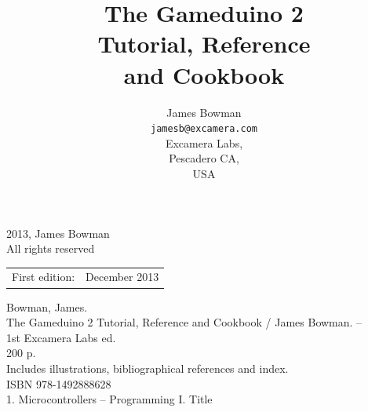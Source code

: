 \documentclass[10pt]{book}
\title{\LARGE \bf
The Gameduino 2 \\
Tutorial, Reference \\
and Cookbook
}
\author{James Bowman \\
	{\tt\small jamesb@excamera.com} \\
  Excamera Labs, \\
  Pescadero CA, \\
  USA
}
\date{}
\begin{document}
\maketitle

\begingroup
\footnotesize
\parindent 0pt
\parskip \baselineskip
\textcopyright{} 2013, James Bowman \\
All rights reserved

% 
% 
% 
% 

\begin{center}
\begin{tabular}{ll}
First edition:  & December 2013 \\
\end{tabular}
\end{center}

\vfill

Bowman, James.\\
\hspace*{2em} The Gameduino 2 Tutorial, Reference and Cookbook / James Bowman. -- \\
\hspace*{1em} 1st Excamera Labs ed. \\
\hspace*{2em} 200 p. \hspace*{2em} \\
\hspace*{2em} Includes illustrations, bibliographical references and index. \\
\hspace*{2em} ISBN 978-1492888628 \\
\hspace*{2em} 1. Microcontrollers -- Programming \hspace*{2em} I. Title
\end{document}
